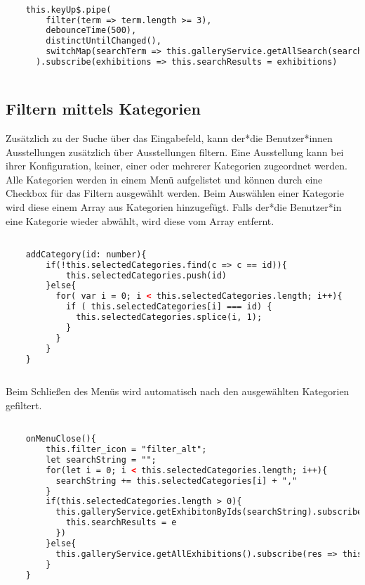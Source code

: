 \begin{lstlisting}[caption={Die Such-Pipe mit den Filter-Operatoren},language=HTML]

    this.keyUp$.pipe(
        filter(term => term.length >= 3),
        debounceTime(500),
        distinctUntilChanged(),
        switchMap(searchTerm => this.galleryService.getAllSearch(searchTerm)),
      ).subscribe(exhibitions => this.searchResults = exhibitions)
        
\end{lstlisting}

\subsection{Filtern mittels Kategorien}

Zusätzlich zu der Suche über das Eingabefeld, kann der*die Benutzer*innen Ausstellungen zusätzlich über Ausstellungen filtern. Eine Ausstellung kann bei ihrer Konfiguration, keiner, einer oder mehrerer Kategorien zugeordnet werden. Alle Kategorien werden in einem Menü aufgelistet und können durch eine Checkbox für das Filtern ausgewählt werden. Beim Auswählen einer Kategorie wird diese einem Array aus Kategorien hinzugefügt. Falls der*die Benutzer*in eine Kategorie wieder abwählt, wird diese vom Array entfernt.   


\begin{lstlisting}[caption={Auswählen und Abwählen der Kategorien},language=HTML]

    addCategory(id: number){
        if(!this.selectedCategories.find(c => c == id)){
            this.selectedCategories.push(id)
        }else{
          for( var i = 0; i < this.selectedCategories.length; i++){
            if ( this.selectedCategories[i] === id) {
              this.selectedCategories.splice(i, 1);
            }
          }
        }
    }
        
\end{lstlisting}

Beim Schließen des Menüs wird automatisch nach den ausgewählten Kategorien gefiltert.


\begin{lstlisting}[caption={Filter von Kategorien anwenden},language=HTML]

    onMenuClose(){
        this.filter_icon = "filter_alt";
        let searchString = "";
        for(let i = 0; i < this.selectedCategories.length; i++){
          searchString += this.selectedCategories[i] + ","
        }
        if(this.selectedCategories.length > 0){
          this.galleryService.getExhibitonByIds(searchString).subscribe(e => {
            this.searchResults = e
          })
        }else{
          this.galleryService.getAllExhibitions().subscribe(res => this.searchResults = res);
        }
    }
\end{lstlisting}



